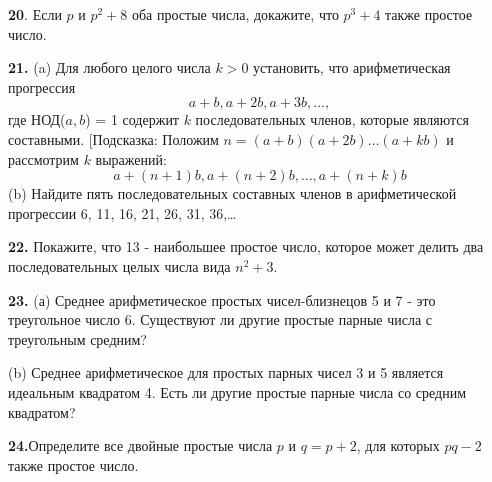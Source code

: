\documentclass[11pt]{article}
\begin{document}
\textbf{20}.	Если $p$ и $p^2 + 8$ оба простые числа, докажите, что $p^3 + 4$ также простое число.

\textbf{21.	}(a) Для любого целого числа $k> 0$ установить, что арифметическая прогрессия
\[
a+b,a+2b,a+3b,\ldots,
\]
где НОД($a, b$) = 1 содержит $k$ последовательных членов, которые являются составными. [Подсказка: Положим $n = (a+b)(a+2b) \ldots (a+kb)$ и рассмотрим $k$ выражений:
\[
a+(n+1)b,a+(n+2)b,\ldots,a+(n+k)b
\]
\qquad(b) Найдите пять последовательных составных членов в арифметической прогрессии
6, 11, 16, 21, 26, 31, 36,\ldots 

\textbf{22.}	Покажите, что 13 - наибольшее простое число, которое может делить два последовательных целых числа вида $n^2 + 3$.

\textbf{23.}
(а) Среднее арифметическое простых чисел-близнецов 5 и 7 - это треугольное число 6. Существуют ли другие простые парные числа с треугольным средним?

\qquad(b) Среднее арифметическое для простых парных чисел 3 и 5 является идеальным квадратом 4. Есть ли другие простые парные числа со средним квадратом?

\textbf{24.}Определите все двойные простые числа $p$ и $q=p+2$, для которых $pq-2$ также простое число.
\end{document}
